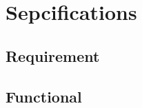 \documentclass{article}
\begin{document}
	\section{Sepcifications}
	\label{sec:specs}
	\paragraph{}
	\lipsum[1-2]
	
	\subsection{Requirement}
	\label{subsec:requirement}
	\paragraph{}
	\lipsum[1-2]
	
	\subsection{Functional}
	\label{subsec:functional}
	\paragraph{}
	\lipsum[1-2]
	
	
\end{document}
